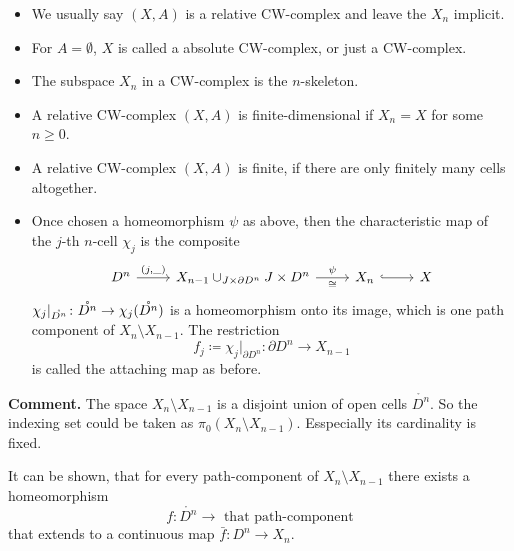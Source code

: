 \documentclass{TemplateLecture}
\begin{document}
\begin{notation}
    \begin{itemize}
        \item We usually say \((X,A)\) is a relative CW-complex and leave the \(X_n\) implicit.
        \item For \(A = \emptyset\), \(X\) is called a absolute CW-complex, or just a CW-complex.
        \item The subspace \(X_n\) in a CW-complex is the \(n\)-skeleton.
        \item A relative CW-complex \((X,A)\) is finite-dimensional if \(X_n = X\) for some \(n \geq 0\).
        \item A relative CW-complex \((X,A)\) is finite, if there are only finitely many cells altogether.
        \item Once chosen a homeomorphism \(\psi\) as above, then the characteristic map  of the \(j\)-th \(n\)-cell \(\chi_j\) is the composite
        \[\begin{tikzcd}
            D^n \ar[r, "{(j, \_)}"] & X_{n-1}\cup_{J\times \partial D^n} J \times D^n \ar[r, "\psi", "\cong"'] & X_n \ar[r, hook] & X
        \end{tikzcd}\]
        \(\chi_j\rvert_{\mathring{D^n}} \colon \mathring{D^n} \to \chi_j(\mathring{D^n})\) is a homeomorphism onto its image, which is one path component of \(X_n \setminus X_{n-1}\). The restriction
        \[f_j \coloneq \chi_j\rvert_{\partial D^n}\colon \partial D^n \to X_{n-1}\]
        is called the attaching map as before.
    \end{itemize}
\end{notation}

\textbf{Comment.} The space \(X_n \setminus X_{n-1}\) is a disjoint union of open cells \(\mathring{D^n}\). So the indexing set could be taken as \(\pi_0(X_n\setminus X_{n-1})\). Esspecially its cardinality is fixed.

It can be shown, that for every path-component of \(X_n \setminus X_{n-1}\) there exists a homeomorphism
\[f \colon \mathring{D^n} \to \text{ that path-component}\]
that extends to a continuous map \(\bar f \colon D^n \to X_n\).
\end{document}
